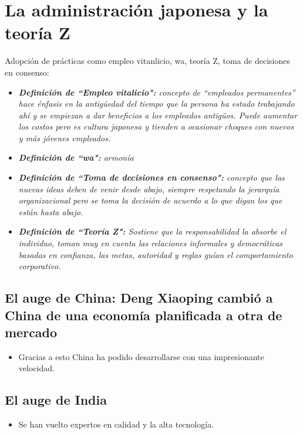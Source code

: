 \documentclass{article}
\begin{document}
\section{La administración japonesa y la teoría Z}
Adopción de prácticas como empleo vitanlicio, wa, teoría Z, toma de decisiones en consenso: 
\begin{itemize}
    \item \emph{\textbf{Definición de ``Empleo vitalicio":} concepto de ``empleados permanentes'' hace énfasis en la antigüedad del tiempo que la persona ha estado trabajando ahí y se empiezan a dar beneficios a los empleados antigüos. Puede aumentar los costos pero es cultura japonesa y tienden a ocasionar choques con nuevos y más jóvenes empleados.}
    \item \emph{\textbf{Definición de ``wa":} armonía}
    \item \emph{\textbf{Definición de ``Toma de decisiones en consenso":} concepto que las nuevas ideas deben de venir desde abajo, siempre respetando la jerarquía organizacional pero se toma la decisión de acuerdo a lo que digan los que están hasta abajo.}
    \item \emph{\textbf{Definición de ``Teoría Z":} Sostiene que la responsabilidad la absorbe el individuo, toman muy en cuenta las relaciones informales y democráticas basadas en confianza, las metas, autoridad y reglas guían el comportamiento corporativo.}
\end{itemize}


\subsection{El auge de China: Deng Xiaoping cambió a China de una economía planificada a otra de mercado}
\begin{itemize}
    \item Gracias a esto China ha podido desarrollarse con una impresionante velocidad.
\end{itemize}


\subsection{El auge de India}
\begin{itemize}
    \item Se han vuelto expertos en calidad y la alta tecnología.
\end{itemize}
\end{document}
